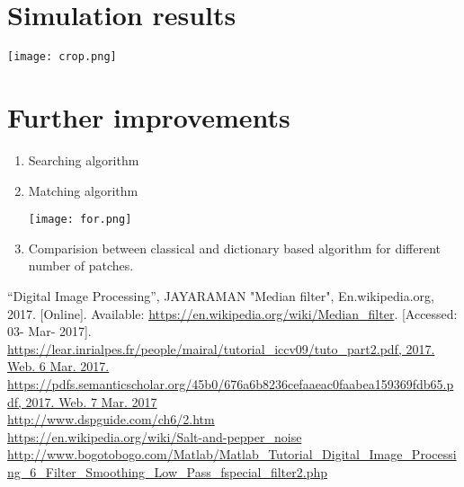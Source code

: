 \documentclass[journal]{IEEEtran}
\begin{document}
	\section{\textbf{Simulation results}}
	    \begin{minipage}{\linewidth}
    		\centering
    		\texttt{[image: crop.png]}
	    \end{minipage} 
	
	\newpage
	\section{\textbf{Further improvements}}
	\begin{enumerate}
	    \item Searching algorithm
	    \item Matching algorithm\\
	    \begin{minipage}{\linewidth}
    		\centering
    		\texttt{[image: for.png]}
	    \end{minipage} 
	
	    \item Comparision between classical and dictionary based algorithm for different number of patches.
	\end{enumerate}
	
	\begin{thebibliography}{1}
	“Digital Image Processing”, JAYARAMAN
	"Median filter", En.wikipedia.org, 2017. [Online]. Available:
	\url{https://en.wikipedia.org/wiki/Median_filter}. [Accessed: 03- Mar- 2017].\\
	\url{https://lear.inrialpes.fr/people/mairal/tutorial_iccv09/tuto_part2.pdf, 2017. Web. 6 Mar. 2017.}\\
	\url{https://pdfs.semanticscholar.org/45b0/676a6b8236cefaaeac0faabea159369fdb65.pdf, 2017. Web. 7 Mar. 2017}\\
	\url{ http://www.dspguide.com/ch6/2.htm}\\
	\url{ https://en.wikipedia.org/wiki/Salt-and-pepper_noise}
	\url{ http://www.bogotobogo.com/Matlab/Matlab_Tutorial_Digital_Image_Processing_6_Filter_Smoothing_Low_Pass_fspecial_filter2.php
}
	
	\end{thebibliography}
	
	
	\ifCLASSOPTIONcaptionsoff
	\newpage
	\fi
	
\end{document}
